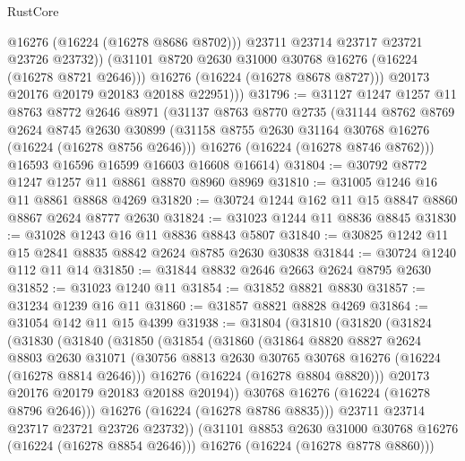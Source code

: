 \begin{lexlean}{RustCore}
\begin{coremodule}
                  @16276
                  (@16224 (@16278 @8686 @8702)))
                @23711
                @23714
                @23717
                @23721
                @23726
                @23732))
            (@31101 @8720 @2630 @31000 @30768 @16276 (@16224 (@16278 @8721 @2646)))
            @16276
            (@16224 (@16278 @8678 @8727)))
          @20173
          @20176
          @20179
          @20183
          @20188
          @22951)))
@31796 := @31127
    @1247
    @1257
    @11
    @8763
    @8772
    @2646
    @8971
    (@31137
      @8763
      @8770
      @2735
      (@31144
        @8762
        @8769
        @2624
        @8745
        @2630
        @30899
        (@31158 @8755 @2630 @31164 @30768 @16276 (@16224 (@16278 @8756 @2646)))
        @16276
        (@16224 (@16278 @8746 @8762)))
      @16593
      @16596
      @16599
      @16603
      @16608
      @16614)
@31804 := @30792 @8772 @1247 @1257 @11 @8861 @8870 @8960 @8969
@31810 := @31005 @1246 @16 @11 @8861 @8868 @4269
@31820 := @30724 @1244 @162 @11 @15 @8847 @8860 @8867 @2624 @8777 @2630
@31824 := @31023 @1244 @11 @8836 @8845
@31830 := @31028 @1243 @16 @11 @8836 @8843 @5807
@31840 := @30825 @1242 @11 @15 @2841 @8835 @8842 @2624 @8785 @2630 @30838
@31844 := @30724 @1240 @112 @11 @14
@31850 := @31844 @8832 @2646 @2663 @2624 @8795 @2630
@31852 := @31023 @1240 @11
@31854 := @31852 @8821 @8830
@31857 := @31234 @1239 @16 @11
@31860 := @31857 @8821 @8828 @4269
@31864 := @31054 @142 @11 @15 @4399
@31938 := @31804
    (@31810
      (@31820
        (@31824
          (@31830
            (@31840
              (@31850
                (@31854
                  (@31860
                    (@31864
                      @8820
                      @8827
                      @2624
                      @8803
                      @2630
                      @31071
                      (@30756 @8813 @2630 @30765 @30768 @16276 (@16224 (@16278 @8814 @2646)))
                      @16276
                      (@16224 (@16278 @8804 @8820)))
                    @20173
                    @20176
                    @20179
                    @20183
                    @20188
                    @20194))
                @30768
                @16276
                (@16224 (@16278 @8796 @2646)))
              @16276
              (@16224 (@16278 @8786 @8835)))
            @23711
            @23714
            @23717
            @23721
            @23726
            @23732))
        (@31101 @8853 @2630 @31000 @30768 @16276 (@16224 (@16278 @8854 @2646)))
        @16276
        (@16224 (@16278 @8778 @8860)))

\end{coremodule}
\end{lexlean}
